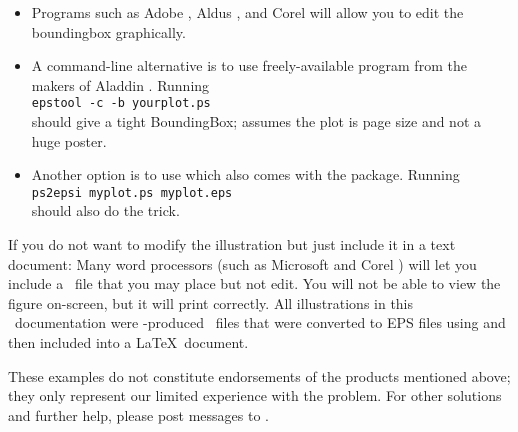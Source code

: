 \begin{itemize}

\item Programs such as Adobe , Aldus
, and Corel  will allow you
to edit the boundingbox graphically.

\item A command-line alternative is to use freely-available
program  from the makers of Aladdin
.  Running \\ 

\indent \texttt{epstool -c -b yourplot.ps} \\ 

should give a tight BoundingBox;  assumes the plot
is page size and not a huge poster.

\item Another option is to use  which also comes
with the  package.  Running \\ 

\indent \texttt{ps2epsi myplot.ps myplot.eps} \\

should also do the trick.

\end{itemize}

If you do not want to modify the illustration but just
include it in a text document: Many word processors (such
as Microsoft  and Corel )
will let you include
a \PS\ file that you may place but not edit.  You will not
be able to view the figure on-screen, but it will print
correctly.  All illustrations in this \GMT\ documentation were
\GMT-produced \PS\ files that were converted to EPS files
using  and then included into a \LaTeX\ document. 

These examples do not constitute endorsements of the products
mentioned above; they only represent our limited experience
with the problem.  For other solutions and further help,
please post messages to
.

